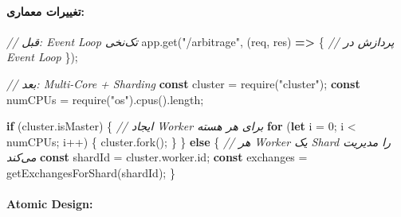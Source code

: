 \documentclass[
]{article}
\newenvironment{Shaded}{}{}
\newcommand{\AttributeTok}[1]{\textcolor[rgb]{0.49,0.56,0.16}{#1}}
\newcommand{\CommentTok}[1]{\textcolor[rgb]{0.38,0.63,0.69}{\textit{#1}}}
\newcommand{\ControlFlowTok}[1]{\textcolor[rgb]{0.00,0.44,0.13}{\textbf{#1}}}
\newcommand{\DecValTok}[1]{\textcolor[rgb]{0.25,0.63,0.44}{#1}}
\newcommand{\FunctionTok}[1]{\textcolor[rgb]{0.02,0.16,0.49}{#1}}
\newcommand{\KeywordTok}[1]{\textcolor[rgb]{0.00,0.44,0.13}{\textbf{#1}}}
\newcommand{\NormalTok}[1]{#1}
\newcommand{\OperatorTok}[1]{\textcolor[rgb]{0.40,0.40,0.40}{#1}}
\newcommand{\PreprocessorTok}[1]{\textcolor[rgb]{0.74,0.48,0.00}{#1}}
\newcommand{\StringTok}[1]{\textcolor[rgb]{0.25,0.44,0.63}{#1}}
\begin{document}
\paragraph{تغییرات
معماری:}\label{ux62aux63aux6ccux6ccux631ux627ux62a-ux645ux639ux645ux627ux631ux6cc}

\begin{Shaded}
\begin{Highlighting}[]
\CommentTok{// قبل: Event Loop تک‌نخی}
\NormalTok{app}\OperatorTok{.}\FunctionTok{get}\NormalTok{(}\StringTok{"/arbitrage"}\OperatorTok{,}\NormalTok{ (req}\OperatorTok{,}\NormalTok{ res) }\KeywordTok{=\textgreater{}}\NormalTok{ \{}
  \CommentTok{// پردازش در Event Loop}
\NormalTok{\})}\OperatorTok{;}

\CommentTok{// بعد: Multi{-}Core + Sharding}
\KeywordTok{const}\NormalTok{ cluster }\OperatorTok{=} \PreprocessorTok{require}\NormalTok{(}\StringTok{"cluster"}\NormalTok{)}\OperatorTok{;}
\KeywordTok{const}\NormalTok{ numCPUs }\OperatorTok{=} \PreprocessorTok{require}\NormalTok{(}\StringTok{"os"}\NormalTok{)}\OperatorTok{.}\FunctionTok{cpus}\NormalTok{()}\OperatorTok{.}\AttributeTok{length}\OperatorTok{;}

\ControlFlowTok{if}\NormalTok{ (cluster}\OperatorTok{.}\AttributeTok{isMaster}\NormalTok{) \{}
  \CommentTok{// ایجاد Worker برای هر هسته}
  \ControlFlowTok{for}\NormalTok{ (}\KeywordTok{let}\NormalTok{ i }\OperatorTok{=} \DecValTok{0}\OperatorTok{;}\NormalTok{ i }\OperatorTok{\textless{}}\NormalTok{ numCPUs}\OperatorTok{;}\NormalTok{ i}\OperatorTok{++}\NormalTok{) \{}
\NormalTok{    cluster}\OperatorTok{.}\FunctionTok{fork}\NormalTok{()}\OperatorTok{;}
\NormalTok{  \}}
\NormalTok{\} }\ControlFlowTok{else}\NormalTok{ \{}
  \CommentTok{// هر Worker یک Shard را مدیریت می‌کند}
  \KeywordTok{const}\NormalTok{ shardId }\OperatorTok{=}\NormalTok{ cluster}\OperatorTok{.}\AttributeTok{worker}\OperatorTok{.}\AttributeTok{id}\OperatorTok{;}
  \KeywordTok{const}\NormalTok{ exchanges }\OperatorTok{=} \FunctionTok{getExchangesForShard}\NormalTok{(shardId)}\OperatorTok{;}
\NormalTok{\}}
\end{Highlighting}
\end{Shaded}

\paragraph{Atomic Design:}\label{atomic-design-1}
\end{document}
